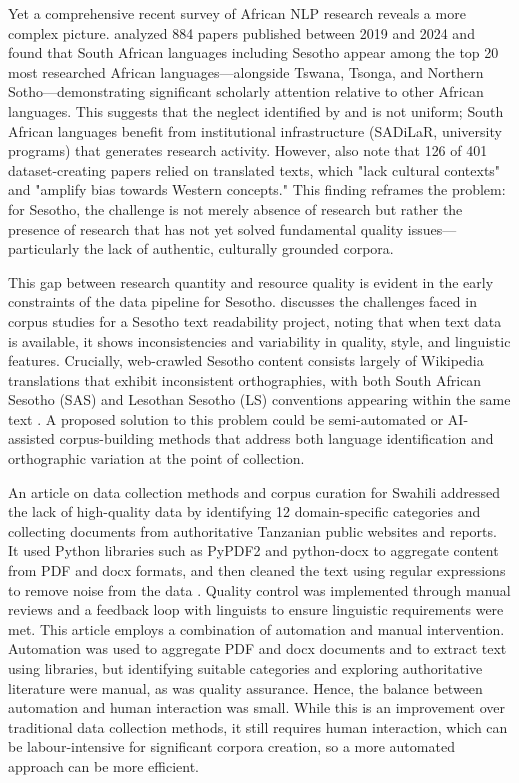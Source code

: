 \documentclass[11pt,a4paper]{article}
\begin{document}
Yet a comprehensive recent survey of African NLP research reveals a more complex picture. \citet{alabi-etal-2025-charting} analyzed 884 papers published between 2019 and 2024 and found that South African languages including Sesotho appear among the top 20 most researched African languages—alongside Tswana, Tsonga, and Northern Sotho—demonstrating significant scholarly attention relative to other African languages. This suggests that the neglect identified by \citet{Kambarami2021} and \citep{joshi-etal-2020-state} is not uniform; South African languages benefit from institutional infrastructure (SADiLaR, university programs) that generates research activity. However, \citet{alabi-etal-2025-charting} also note that 126 of 401 dataset-creating papers relied on translated texts, which "lack cultural contexts" and "amplify bias towards Western concepts." This finding reframes the problem: for Sesotho, the challenge is not merely absence of research but rather the presence of research that has not yet solved fundamental quality issues—particularly the lack of authentic, culturally grounded corpora.

This gap between research quantity and resource quality is evident in the early constraints of the data pipeline for Sesotho. \citet{Sibeko2024} discusses the challenges faced in corpus studies for a Sesotho text readability project, noting that when text data is available, it shows inconsistencies and variability in quality, style, and linguistic features. Crucially, web-crawled Sesotho content consists largely of Wikipedia translations that exhibit inconsistent orthographies, with both South African Sesotho (SAS) and Lesothan Sesotho (LS) conventions appearing within the same text \citep{Sibeko2024}. A proposed solution to this problem could be semi-automated or AI-assisted corpus-building methods that address both language identification and orthographic variation at the point of collection.

\vspace{1em}
An article on data collection methods and corpus curation for Swahili addressed the lack of high-quality data by identifying 12 domain-specific categories and collecting documents from authoritative Tanzanian public websites and reports. It used Python libraries such as PyPDF2 and python-docx to aggregate content from PDF and docx formats, and then cleaned the text using regular expressions to remove noise from the data \citep{Masua2024}. Quality control was implemented through manual reviews and a feedback loop with linguists to ensure linguistic requirements were met. This article employs a combination of automation and manual intervention. Automation was used to aggregate PDF and docx documents and to extract text using libraries, but identifying suitable categories and exploring authoritative literature were manual, as was quality assurance. Hence, the balance between automation and human interaction was small. While this is an improvement over traditional data collection methods, it still requires human interaction, which can be labour-intensive for significant corpora creation, so a more automated approach can be more efficient.
\end{document}
